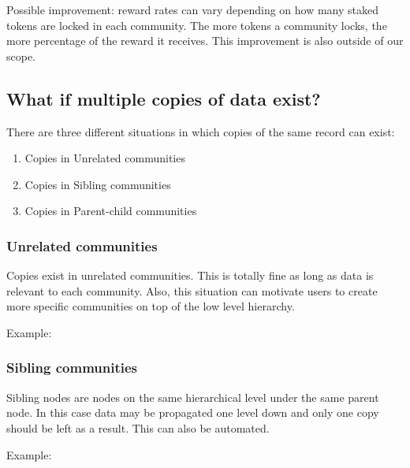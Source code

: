 \documentclass[10pt,a4paper]{article}
\begin{document}
Possible improvement: reward rates can vary depending on how many staked tokens are locked in each community. The more tokens a community locks, the more percentage of the reward it receives. This improvement is also outside of our scope.

\subsection{What if multiple copies of data exist?}
There are three different situations in which copies of the same record can exist: 

\begin{enumerate}
    \item Copies in Unrelated communities
    \item Copies in Sibling communities
    \item Copies in Parent-child communities
\end{enumerate}

\subsubsection{Unrelated communities}
Copies exist in unrelated communities. This is totally fine as long as data is relevant to each community. Also, this situation can motivate users to create more specific communities on top of the low level hierarchy.

Example:


\subsubsection{Sibling communities}
Sibling nodes are nodes on the same hierarchical level under the same parent node. In this case data may be propagated one level down and only one copy should be left as a result. This can also be automated.

Example:

\end{document}
